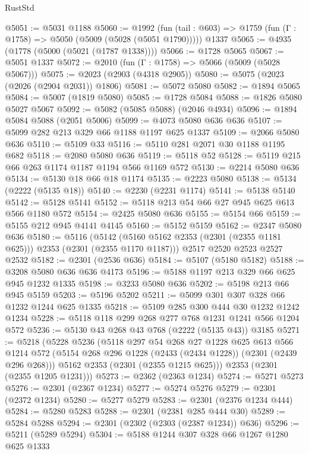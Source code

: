 \begin{lexlean}{RustStd}
\begin{coremodule}
{\begin{coremodule}
{{{{{{{{{{{{{@5051 := @5031 @1188
@5060 := @1992
    (fun (tail : @603) => @1759 (fun (Γ : @1758) => @5050 (@5009 (@5028 (@5051 @1790)))))
    @1337
@5065 := @4935 (@1778 (@5000 (@5021 (@1787 @1338))))
@5066 := @1728 @5065
@5067 := @5051 @1337
@5072 := @2010 (fun (Γ : @1758) => @5066 (@5009 (@5028 @5067)))
@5075 := @2023 (@2903 (@4318 @2905))
@5080 := @5075 (@2023 (@2026 (@2904 @2031)) @1806)
@5081 := @5072 @5080
@5082 := @1894 @5065
@5084 := @5007 (@1819 @5080)
@5085 := @1728 @5084
@5088 := @1826 @5080 @5027 @5067
@5092 := @5082 (@5085 @5088) (@2046 @4934)
@5096 := @1894 @5084 @5088 (@2051 @5006)
@5099 := @4073 @5080 @636 @636
@5107 := @5099 @282 @213 @329 @66 @1188 @1197 @625 @1337
@5109 := @2066 @5080 @636
@5110 := @5109 @33
@5116 := @5110 @281 @2071 @30 @1188 @1195 @682
@5118 := @2080 @5080 @636
@5119 := @5118 @52
@5128 := @5119 @215 @66 @263 @1174 @1187 @1194 @566 @1169 @572
@5130 := @2214 @5080 @636
@5134 := @5130 @18 @66 @18 @1174
@5135 := @2223 @5080
@5138 := @5134 (@2222 (@5135 @18))
@5140 := @2230 (@2231 @1174)
@5141 := @5138 @5140
@5142 := @5128 @5141
@5152 := @5118 @213 @54 @66 @27 @945 @625 @613 @566 @1180 @572
@5154 := @2425 @5080 @636
@5155 := @5154 @66
@5159 := @5155 @212 @945 @4141 @4145
@5160 := @5152 @5159
@5162 := @2347 @5080 @636
@5180 := @5116
    (@5142 (@5160 @5162 @2353 (@2301 (@2355 @1181 @625))) @2353 (@2301 (@2355 @1170 @1187)))
    @2517
    @2520
    @2523
    @2527
    @2532
@5182 := @2301 (@2536 @636)
@5184 := @5107 (@5180 @5182)
@5188 := @3208 @5080 @636 @636 @4173
@5196 := @5188 @1197 @213 @329 @66 @625 @945 @1232 @1335
@5198 := @3233 @5080 @636
@5202 := @5198 @213 @66 @945 @5159
@5203 := @5196 @5202
@5211 := @5099 @301 @307 @328 @66 @1232 @1244 @625 @1335
@5218 := @5109 @285 @300 @444 @30 @1232 @1242 @1234
@5228 := @5118 @118 @299 @268 @277 @768 @1231 @1241 @566 @1204 @572
@5236 := @5130 @43 @268 @43 @768 (@2222 (@5135 @43)) @3185
@5271 := @5218
    (@5228
      @5236
      (@5118
        @297
        @54
        @268
        @27
        @1228
        @625
        @613
        @566
        @1214
        @572
        (@5154 @268 @296 @1228 (@2433 (@2434 @1228)) (@2301 (@2439 @296 @268)))
        @5162
        @2353
        (@2301 (@2355 @1215 @625)))
      @2353
      (@2301 (@2355 @1205 @1231)))
@5273 := @2362 (@2363 @1234)
@5274 := @5271 @5273
@5276 := @2301 (@2367 @1234)
@5277 := @5274 @5276
@5279 := @2301 (@2372 @1234)
@5280 := @5277 @5279
@5283 := @2301 (@2376 @1234 @444)
@5284 := @5280 @5283
@5288 := @2301 (@2381 @285 @444 @30)
@5289 := @5284 @5288
@5294 := @2301 (@2302 (@2303 (@2387 @1234)) @636)
@5296 := @5211 (@5289 @5294)
@5304 := @5188 @1244 @307 @328 @66 @1267 @1280 @625 @1333
}}}}}}}}}}}}}
\end{coremodule}}
\end{coremodule}
\end{lexlean}

